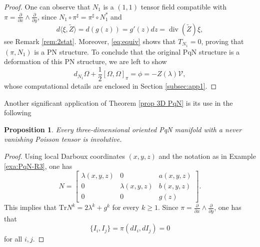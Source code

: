 \documentclass[12pt]{article}
\newtheorem{theorem}{Theorem}%
\newtheorem{prop}[theorem]{Proposition}
\begin{document}
\begin{proof}
One can observe that $N_1$ is a $(1,1)$ tensor field compatible with $\pi=\frac{\partial}{\partial x}\wedge\frac{\partial}{\partial y}$, since $N_1\circ\pi^{\sharp}=\pi^{\sharp}\circ N_1^{*}$ and
\[
d\langle \xi,\widetilde{Z}\rangle=d(g(z))=g'(z)dz=\operatorname{div}(\widetilde{Z})\xi,
\]
see Remark \ref{rem:2stat}. Moreover, \eqref{eq:equiv} shows that $T_{N_1}=0$, proving that $(\pi,N_1)$ is a PN structure. 
To conclude that the original PqN structure is a deformation of this PN structure, we are left to show 
\begin{equation}
d_{N_1}\Omega+\frac{1}{2}\left[\Omega,\Omega\right]_{\pi}=\phi=-Z(\lambda)\mathcal V,\label{eq:dNphi}
\end{equation}
whose computational details are enclosed in Section \ref{subsec:app1}.
\end{proof}

Another significant application of Theorem \ref{prop 3D PqN}  is its use in the following
\begin{prop}\label{thm:inv3}
Every three-dimensional oriented PqN manifold with a never vanishing Poisson tensor is involutive.
\end{prop}
\begin{proof}
Using local Darboux coordinates $(x,y,z)$ and the notation as in Example \ref{exa:PqN-R3}, one has
\begin{equation}
N=\begin{bmatrix}\lambda(x,y,z) & 0 & a(x,y,z)\\ 0 & \lambda(x,y,z) & b(x,y,z) \\ 0 & 0 & g(z)\end{bmatrix}.\label{eq:thanksRef}
\end{equation}
This implies that $\text{Tr} N^k=2\lambda^k+g^k$ for every $k\geq 1$. Since $\pi=\frac{\partial}{\partial x}\wedge\frac{\partial}{\partial y}$, 
one has that 
\[
\{I_i,I_j\}=\pi(dI_i,dI_j)=0
\]
for all $i,j$.\end{proof}
\end{document}
